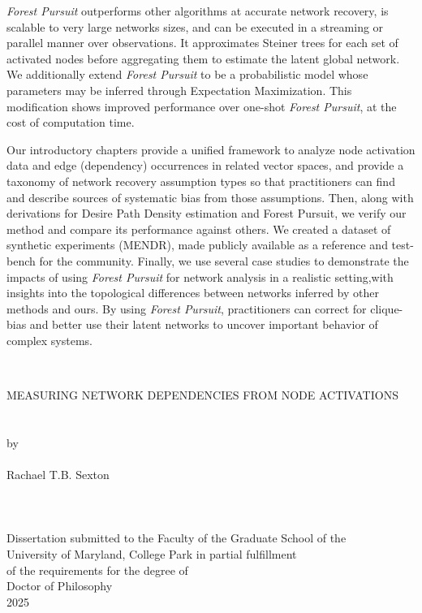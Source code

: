 \documentclass[%
	12pt,
		oneside,
		letterpaper
]{book}
\begin{document}
\emph{Forest Pursuit} outperforms other algorithms at accurate network recovery, is scalable to very large networks sizes, and can be executed in a streaming or parallel manner over observations.
It approximates Steiner trees for each set of activated nodes before aggregating them to estimate the latent global network.
We additionally extend \emph{Forest Pursuit} to be a probabilistic model whose parameters may be inferred through Expectation Maximization.
This modification shows improved performance over one-shot \emph{Forest Pursuit}, at the cost of computation time.

Our introductory chapters provide a unified framework to analyze node activation data and edge (dependency) occurrences in related vector spaces, and provide a taxonomy of network recovery assumption types so that practitioners can find and describe sources of systematic bias from those assumptions.
Then, along with derivations for Desire Path Density estimation and Forest Pursuit, we verify our method and compare its performance against others.
We created a dataset of synthetic experiments (MENDR), made publicly available as a reference and test-bench for the community.
Finally, we use several case studies to demonstrate the impacts of using \emph{Forest Pursuit} for network analysis in a realistic setting,with insights into the topological differences between networks inferred by other methods and ours.
By using \emph{Forest Pursuit}, practitioners can correct for clique-bias and better use their latent networks to uncover important behavior of complex systems.\par
\clearpage%

\thispagestyle{empty} \hbox{\ } \vspace{1.5in}
\singlespacing
\small\normalsize
\begin{center}

\large{\uppercase{Measuring Network Dependencies from Node Activations}}\\
\ \\ 
\ \\
\large{by} \\
\ \\
\large{Rachael T.B. Sexton}
\ \\
\ \\
\ \\
\ \\
\normalsize
Dissertation submitted to the Faculty of the Graduate School of the \\
University of Maryland, College Park in partial fulfillment \\
of the requirements for the degree of \\
Doctor of Philosophy \\
2025
\end{center}
\end{document}
